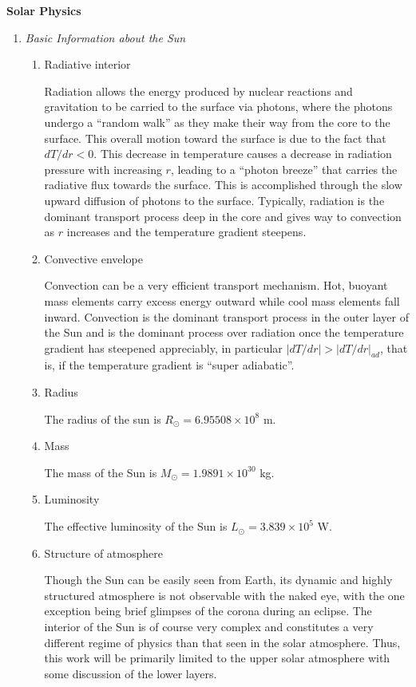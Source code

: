 		\item{\bf Solar Physics}\\
		\begin{enumerate}
			\item{\em Basic Information about the Sun \citep[see][]{carroll_introduction_2007}}
			\begin{enumerate}
				\item{Radiative interior}
				\par Radiation allows the energy produced by nuclear reactions and gravitation to be carried to the surface via photons, where the photons undergo a ``random walk'' as they make their way from the core to the surface. This overall motion toward the surface is due to the fact that $dT/dr<0$. This decrease in temperature causes a decrease in radiation pressure with increasing $r$, leading to a ``photon breeze'' that carries the radiative flux towards the surface. This is accomplished through the slow upward diffusion of photons to the surface. Typically, radiation is the dominant transport process deep in the core and gives way to convection as $r$ increases and the temperature gradient steepens.
				\item{Convective envelope}
				\par Convection can be a very efficient transport mechanism. Hot, buoyant mass elements carry excess energy outward while cool mass elements fall inward. Convection is the dominant transport process in the outer layer of the Sun and is the dominant process over radiation once the temperature gradient has steepened appreciably, in particular $\left|dT/dr\right|>\left|dT/dr\right|_{ad}$, that is, if the temperature gradient is ``super adiabatic''. 
				\item{Radius}
				\par The radius of the sun is $R_{\odot} = 6.95508\times10^8$ m.
				\item{Mass}
				\par The mass of the Sun is $M_{\odot} = 1.9891\times10^{30}$ kg.
				\item{Luminosity}
				\par The effective luminosity of the Sun is $L_{\odot} = 3.839\times10^5$ W.
				\item{Structure of atmosphere}
				\par Though the Sun can be easily seen from Earth, its dynamic and highly structured atmosphere is not observable with the naked eye, with the one exception being brief glimpses of the corona during an eclipse. The interior of the Sun is of course very complex and constitutes a very different regime of physics than that seen in the solar atmosphere. Thus, this work will be primarily limited to the upper solar atmosphere with some discussion of the lower layers.

\end{enumerate}
\end{enumerate}
